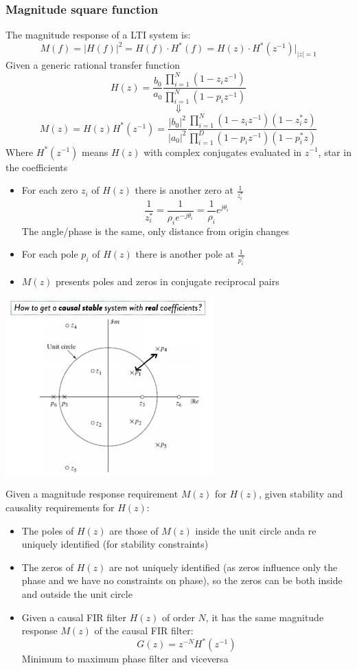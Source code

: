 \subsubsection{Magnitude square function}
The magnitude response of a LTI system is:
$$
M(f)=|H(f)|^2=H(f)\cdot H^*(f)=H(z)\cdot H^*(z^{-1})\big|_{|z|=1}
$$
Given a generic rational transfer function
$$
H(z)=\frac{b_0}{a_0}\frac{
    \prod_{i=1}^N(1-z_iz^{-1})
}{\prod_{i=1}^N(1-p_iz^{-1})}
$$
$$
\Downarrow
$$
$$
M(z)=H(z)H^*(z^{-1})=\frac{|b_0|^2}{|a_0|^2}
\frac{
    \prod_{i=1}^N(1-z_iz^{-1})(1-z_i^*z)
}{\prod_{i=1}^D(1-p_iz^{-1})(1-p_i^*z)}
$$
Where $H^*(z^{-1})$ means $H(z)$ with complex conjugates evaluated in $z^{-1}$, star in the coefficients
\begin{itemize}
    \item For each zero $z_i$ of $H(z)$ there is another zero at $\frac{1}{z_i^*}$
    $$
    \frac{1}{z_i^*}=\frac{1}{\rho_ie^{-j\theta_i}}=\frac{1}{\rho_i}e^{j\theta_i}
    $$
    The angle/phase is the same, only distance from origin changes
    \item For each pole $p_i$ of $H(z)$ there is another pole at $\frac{1}{p_i^*}$
    \item $M(z)$ presents poles and zeros in conjugate reciprocal pairs
\end{itemize}
\begin{center}
    \includegraphics[width=0.6\textwidth]{images/magnitued_square.png}
\end{center}
Given a magnitude response requirement $M(z)$ for $H(z)$, given stability and causality requirements for $H(z)$:
\begin{itemize}
    \item The poles of $H(z)$ are those of $M(z)$ inside the unit circle anda re uniquely identified (for stability constraints)
    \item The zeros of $H(z)$ are not uniquely identified (as zeros influence only the phase and we have no constraints on phase), so the zeros can be both inside and outside the unit circle
    \item Given a causal FIR filter $H(z)$ of order $N$, it has the same magnitude  response $M(z)$ of the causal FIR filter:
    $$G(z)=z^{-N}H^*(z^{-1})$$
    Minimum to maximum phase filter and viceversa
\end{itemize}
